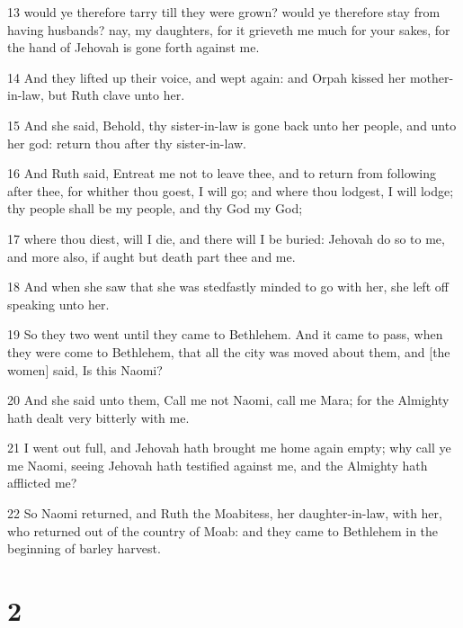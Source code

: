 \par 13 would ye therefore tarry till they were grown? would ye therefore stay from having husbands? nay, my daughters, for it grieveth me much for your sakes, for the hand of Jehovah is gone forth against me.
\par 14 And they lifted up their voice, and wept again: and Orpah kissed her mother-in-law, but Ruth clave unto her.
\par 15 And she said, Behold, thy sister-in-law is gone back unto her people, and unto her god: return thou after thy sister-in-law.
\par 16 And Ruth said, Entreat me not to leave thee, and to return from following after thee, for whither thou goest, I will go; and where thou lodgest, I will lodge; thy people shall be my people, and thy God my God;
\par 17 where thou diest, will I die, and there will I be buried: Jehovah do so to me, and more also, if aught but death part thee and me.
\par 18 And when she saw that she was stedfastly minded to go with her, she left off speaking unto her.
\par 19 So they two went until they came to Bethlehem. And it came to pass, when they were come to Bethlehem, that all the city was moved about them, and [the women] said, Is this Naomi?
\par 20 And she said unto them, Call me not Naomi, call me Mara; for the Almighty hath dealt very bitterly with me.
\par 21 I went out full, and Jehovah hath brought me home again empty; why call ye me Naomi, seeing Jehovah hath testified against me, and the Almighty hath afflicted me?
\par 22 So Naomi returned, and Ruth the Moabitess, her daughter-in-law, with her, who returned out of the country of Moab: and they came to Bethlehem in the beginning of barley harvest.

\chapter{2}

